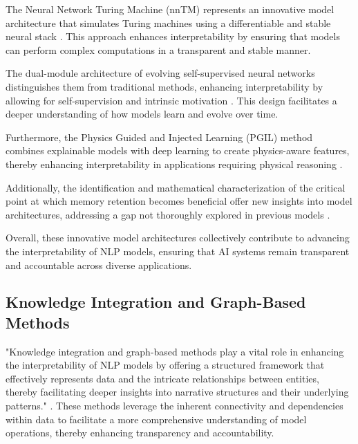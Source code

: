 The Neural Network Turing Machine (nnTM) represents an innovative model architecture that simulates Turing machines using a differentiable and stable neural stack \cite{stogin2022provablystableneuralnetwork}. This approach enhances interpretability by ensuring that models can perform complex computations in a transparent and stable manner.

The dual-module architecture of evolving self-supervised neural networks distinguishes them from traditional methods, enhancing interpretability by allowing for self-supervision and intrinsic motivation \cite{le2019evolvingselfsupervisedneuralnetworks}. This design facilitates a deeper understanding of how models learn and evolve over time.

Furthermore, the Physics Guided and Injected Learning (PGIL) method combines explainable models with deep learning to create physics-aware features, thereby enhancing interpretability in applications requiring physical reasoning \cite{huang2022physicallyexplainablecnnsar}.

Additionally, the identification and mathematical characterization of the critical point at which memory retention becomes beneficial offer new insights into model architectures, addressing a gap not thoroughly explored in previous models \cite{lathouwers2017memorypaysdiscordhidden}.

Overall, these innovative model architectures collectively contribute to advancing the interpretability of NLP models, ensuring that AI systems remain transparent and accountable across diverse applications.




\subsection{Knowledge Integration and Graph-Based Methods} \label{subsec:Knowledge Integration and Graph-Based Methods}



"Knowledge integration and graph-based methods play a vital role in enhancing the interpretability of NLP models by offering a structured framework that effectively represents data and the intricate relationships between entities, thereby facilitating deeper insights into narrative structures and their underlying patterns." \cite{jannidis2016analyzingfeaturesdetectionhappy}. These methods leverage the inherent connectivity and dependencies within data to facilitate a more comprehensive understanding of model operations, thereby enhancing transparency and accountability.



